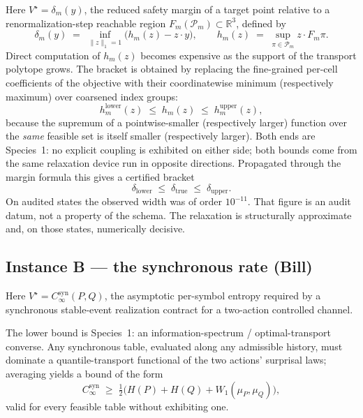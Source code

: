 \documentclass[11pt,a4paper]{article}
\newcommand{\Pcal}{\mathcal{P}}
\begin{document}
Here \(V^\star=\delta_m(y)\), the reduced safety margin of a target point relative to a renormalization-step reachable region \(F_m(\Pcal_m)\subset\mathbb{R}^3\), defined by
\begin{equation}
  \delta_m(y)
  \;=\;
  \inf_{\|z\|_1=1}\bigl(h_m(z)-z\cdot y\bigr),
  \qquad
  h_m(z)
  \;=\;
  \sup_{\pi\in\Pcal_m} z\cdot F_m\pi.
\end{equation}
Direct computation of \(h_m(z)\) becomes expensive as the support of the transport polytope grows. The bracket is obtained by replacing the fine-grained per-cell coefficients of the objective with their coordinatewise minimum (respectively maximum) over coarsened index groups:
\begin{equation}
  h_m^{\mathrm{lower}}(z)
  \;\le\;
  h_m(z)
  \;\le\;
  h_m^{\mathrm{upper}}(z),
\end{equation}
because the supremum of a pointwise-smaller (respectively larger) function over the \emph{same} feasible set is itself smaller (respectively larger). Both ends are Species~1: no explicit coupling is exhibited on either side; both bounds come from the same relaxation device run in opposite directions. Propagated through the margin formula this gives a certified bracket
\begin{equation}
  \delta_{\mathrm{lower}}
  \;\le\;
  \delta_{\mathrm{true}}
  \;\le\;
  \delta_{\mathrm{upper}}.
\end{equation}
On audited states the observed width was of order \(10^{-11}\). That figure is an audit datum, not a property of the schema. The relaxation is structurally approximate and, on those states, numerically decisive.

\subsection{Instance B --- the synchronous rate (Bill)}

Here \(V^\star=C^{\mathrm{syn}}_\infty(P,Q)\), the asymptotic per-symbol entropy required by a synchronous stable-event realization contract for a two-action controlled channel.

The lower bound is Species~1: an information-spectrum / optimal-transport converse. Any synchronous table, evaluated along any admissible history, must dominate a quantile-transport functional of the two actions' surprisal laws; averaging yields a bound of the form
\begin{equation}
  C^{\mathrm{syn}}_\infty
  \;\ge\;
  \tfrac12\bigl(H(P)+H(Q)+W_1(\mu_P,\mu_Q)\bigr),
\end{equation}
valid for every feasible table without exhibiting one.
\end{document}
